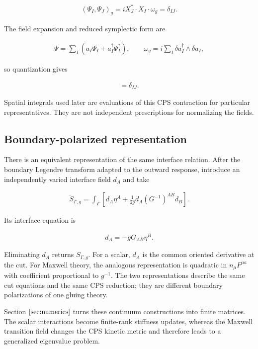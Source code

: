 \begin{align}
(\Psi_I,\Psi_J)_g
=iX_J^*\mathbin{\cdot}X_I\mathbin{\cdot}\omega_g
=\delta_{IJ}.
\end{align}

The field expansion and reduced symplectic form are

\begin{align}
\Psi=\sum_I\left(a_I\Psi_I+a_I^\dagger\Psi_I^*\right),
\qquad
\omega_g=i\sum_I\delta a_I^\dagger\wedge\delta a_I,
\end{align}

so quantization gives

\begin{align}
[a_I,a_J^\dagger]=\delta_{IJ}.
\end{align}

Spatial integrals used later are evaluations of this CPS contraction for particular representatives. They are not independent prescriptions for normalizing the fields.

\subsection{Boundary-polarized representation}\label{subsec:boundary-polarized}

There is an equivalent representation of the same interface relation. After the boundary Legendre transform adapted to the outward response, introduce an independently varied interface field $d_A$ and take

\begin{align}
\widetilde S_{\Gamma,g}
=\int_{\Gamma}\left[
d_A\eta^A+\frac{1}{2g}d_A(G^{-1})^{AB}d_B
\right].
\end{align}

Its interface equation is

\begin{align}
d_A=-gG_{AB}\eta^B.
\end{align}

Eliminating $d_A$ returns $S_{\Gamma,g}$. For a scalar, $d_A$ is the common oriented derivative at the cut. For Maxwell theory, the analogous representation is quadratic in $n_\mu F^{\mu a}$ with coefficient proportional to $g^{-1}$. The two representations describe the same cut equations and the same CPS reduction; they are different boundary polarizations of one gluing theory.

Section $\ref{sec:numerics}$ turns these continuum constructions into finite matrices. The scalar interactions become finite-rank stiffness updates, whereas the Maxwell transition field changes the CPS kinetic metric and therefore leads to a generalized eigenvalue problem.
